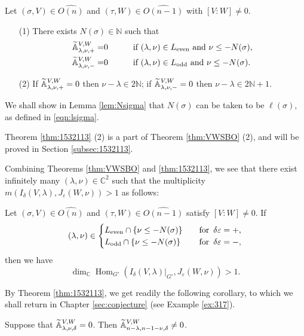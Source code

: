 \begin{theorem}
\label{thm:1532113}
Let $(\sigma, V) \in \widehat {O(n)}$
 and $(\tau, W) \in \widehat {O(n-1)}$
 with $[V:W]\ne 0$.  
\begin{enumerate}
\item[{\rm{(1)}}]
There exists 
$
N(\sigma) \in {\mathbb{N}}
$
such that
\begin{alignat*}{2}
{\widetilde{\mathbb{A}}}_{{\lambda},{\nu},{+}}^{{V,W}} =&0
\qquad
&&\text{if } (\lambda,\nu) \in L_{\operatorname{even}}
\text{ and } \nu \le -N(\sigma), 
\\
{\widetilde{\mathbb{A}}}_{{\lambda},{\nu},{-}}^{{V,W}} =&0
\qquad
&&\text{if } (\lambda,\nu) \in L_{\operatorname{odd}}
\text{ and } \nu \le -N(\sigma).  
\end{alignat*}
\item[{\rm{(2)}}]
If ${\widetilde{\mathbb{A}}}_{{\lambda},{\nu},{+}}^{{V,W}} =0$
 then 
 $\nu-\lambda \in 2{\mathbb{N}}$;
 if ${\widetilde{\mathbb{A}}}_{{\lambda},{\nu},{-}}^{{V,W}} =0$
then 
 $\nu - \lambda \in 2 {\mathbb{N}}+1$.    
\end{enumerate}
\end{theorem}


\begin{remark}
We shall show in Lemma \ref{lem:Nsigma}
 that $N(\sigma)$ can be taken
 to be $\ell(\sigma)$, 
 as defined in \eqref{eqn:lsigma}.  
\end{remark}

Theorem \ref{thm:1532113} (2) is a part
 of Theorem \ref{thm:VWSBO} (2), 
 and will be proved in Section \ref{subsec:1532113}.  


Combining Theorems \ref{thm:VWSBO} and \ref{thm:1532113}, 
 we see that there exist infinitely many 
 $(\lambda,\nu)\in {\mathbb{C}}^2$
 such that the multiplicity 
$
   m(I_{\delta}(V,\lambda), J_{\varepsilon}(W,\nu))>1
$
 as follows:
\begin{corollary}
\label{cor:170821}
Let $(\sigma,V) \in \widehat {O(n)}$ and $(\tau,W) \in \widehat{O(n-1)}$
 satisfy $[V:W] \ne 0$.  
If 
\[
  (\lambda, \nu) \in 
  \begin{cases}
  L_{\operatorname{even}} \cap \{\nu \le - N(\sigma)\}
  \quad
  &\text{for \,$\delta \varepsilon =+$}, 
\\
  L_{\operatorname{odd}} \cap \{\nu \le - N(\sigma)\}
  \quad
  &\text{for \,$\delta \varepsilon =-$}, 
  \end{cases}
\]
then we have
\[
  \dim_{\mathbb{C}}
  {\operatorname{Hom}}_{G'}
  (I_{\delta}(V,\lambda)|_{G'}, J_{\varepsilon}(W,\nu))>1.  
\]
\end{corollary}
By Theorem \ref{thm:1532113},
 we get readily the following corollary, 
 to which we shall return in Chapter \ref{sec:conjecture}
 (see Example \ref{ex:317}).  
\begin{corollary}
\label{cor:IV1}
Suppose that 
${\widetilde{\mathbb{A}}}_{{\lambda},{\nu},{\delta}}^{{V,W}}=0$.  
Then ${\widetilde{\mathbb{A}}}_{{n-\lambda},{n-1-\nu},{\delta}}^{{V,W}} \ne 0$.  
\end{corollary}

